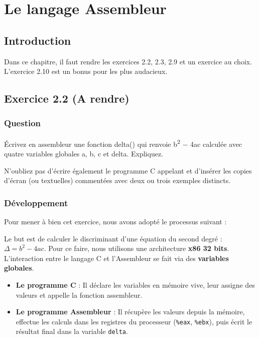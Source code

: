 \setcounter{chapter}{1}
\chapter{Le langage Assembleur}

\section*{Introduction}

Dans ce chapitre, il faut rendre les exercices 2.2, 2.3, 2.9 et un exercice au choix. L'exercice 2.10 est un bonus pour les plus audacieux.

\section{Exercice 2.2 (A rendre)}

\subsection{Question}
Écrivez en assembleur une fonction delta() qui renvoie b\textsuperscript{2} − 4ac calculée avec quatre variables globales a, b, c et delta. Expliquez.

N'oubliez pas d'écrire également le programme C appelant et d'insérer les copies d'écran (ou textuelles) commentées avec deux ou trois exemples distincts.

\subsection{Développement}
Pour mener à bien cet exercice, nous avons adopté le processus suivant :

Le but est de calculer le discriminant d'une équation du second degré : $\Delta = b^2 - 4ac$.
Pour ce faire, nous utilisons une architecture \textbf{x86 32 bits}. L'interaction entre le langage C et l'Assembleur se fait via des \textbf{variables globales}.

\begin{itemize}
    \item \textbf{Le programme C} : Il déclare les variables en mémoire vive, leur assigne des valeurs et appelle la fonction assembleur.
    \item \textbf{Le programme Assembleur} : Il récupère les valeurs depuis la mémoire, effectue les calculs dans les registres du processeur (\texttt{\%eax}, \texttt{\%ebx}), puis écrit le résultat final dans la variable \texttt{delta}.
\end{itemize}

